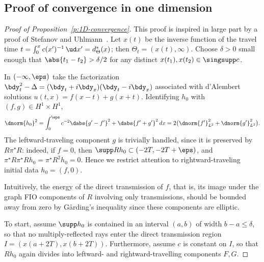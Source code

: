 \documentclass[10pt]{article}
\theoremstyle{plain}
\theoremstyle{definition}
\theoremstyle{remark}
\numberwithin{theorem}{section}
\numberwithin{example}{section}
\numberwithin{equation}{section}
\numberwithin{figure}{section}
\let\d\bdy 						%
\newcommand\Garding{G\aa{}rding}
\begin{document}
\subsection{Proof of convergence in one dimension}					\label{s:compare-proofs}

\begin{proof}[Proof of Proposition~\ref{p:1D-convergence}]
	This proof is inspired in large part by a proof of Stefanov and Uhlmann~\cite[Prop. 5.1]{SU-TATBrain}.
	Let $x(t)$ be the inverse function of the travel time $t=\int_0^x c(x')^{-1}\,\ud x'=d^*_\Theta(x)$; then $\Theta_t=(x(t),\infty)$. Choose $\delta>0$ small enough that $\abs{t_1-t_2}>\delta/2$ for any distinct $x(t_1),x(t_2)\in\singsupp c$. 
		
	In $(-\infty,\eps)$ take the factorization $\d_t^2-\Delta=(\d_t+i\d_x)(\d_t-i\d_x)$ associated with d'Alembert solutions $u(t,x)=f(x-t)+g(x+t)$. Identifying $h_0$ with $(f,g)\in H^1\times H^1$,
	\begin{equation}
		\dnorm{h_0}^2 = \int_0^\eps c^{-2}\dabs{g'-f'}^2 + \dabs{f'+g'}^2\,dx
				 = 2\big(\dnorm{f'}_{L^2}^2+\dnorm{g'}_{L^2}^2\big).
	\end{equation}
	The leftward-traveling component $g$ is trivially handled, since it is preserved by $R\pi^\star R$: indeed, if $f= 0$, then $\supp Rh_0\subset (-2T,-2T+\eps)$, and $\pi^\star R\pi^\star Rh_0=\pi^\star R^2h_0=0$. Hence we restrict attention to rightward-traveling initial data $h_0=(f,0)$.
	
	Intuitively, the energy of the direct transmission of $f$, that is, its image under the graph FIO components of $R$ involving only transmissions, should be bounded away from zero by \Garding's inequality since these components are elliptic.
	
	To start, assume $\supp h_0$ is contained in an interval $(a,b)$ of width $b-a\leq\delta$, so that no multiply-reflected rays enter the direct transmission region $I=(x(a+2T),x(b+2T))$. Furthermore, assume $c$ is constant on $I$, so that $Rh_0$ again divides into leftward- and rightward-travelling components $F,G$. 
	

\end{proof}
\end{document}
